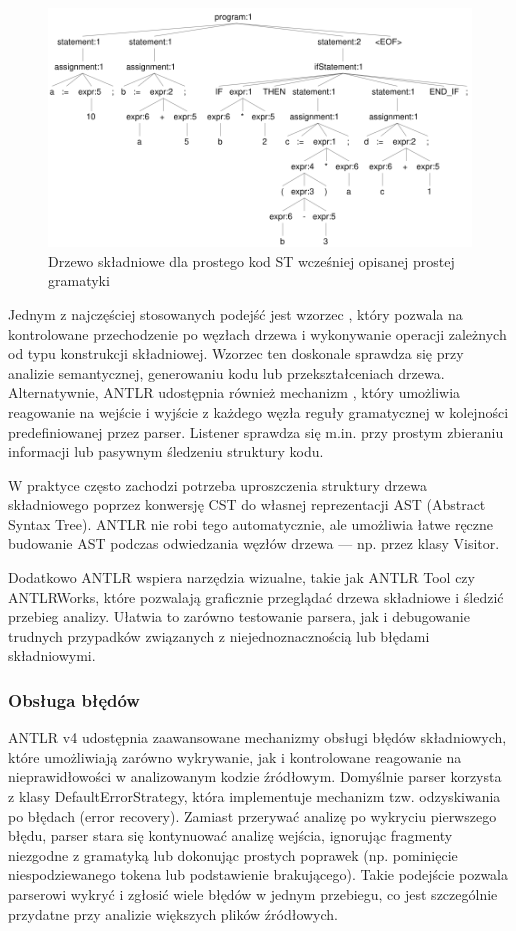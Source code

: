 \documentclass[12pt,twoside]{article}
\begin{document}
\begin{figure}[ht]
   \centering
   \includegraphics[width=15cm]{images/biggerTreeSimple.png}
   \caption{Drzewo składniowe dla prostego kod ST wcześniej opisanej prostej gramatyki}
   \label{Fig:biggerGrammarTree}
\end{figure}

Jednym z najczęściej stosowanych podejść jest wzorzec , który pozwala na kontrolowane przechodzenie po węzłach drzewa i wykonywanie operacji zależnych od typu konstrukcji składniowej. Wzorzec ten doskonale sprawdza się przy analizie semantycznej, generowaniu kodu lub przekształceniach drzewa. Alternatywnie, ANTLR udostępnia również mechanizm , który umożliwia reagowanie na wejście i wyjście z każdego węzła reguły gramatycznej w kolejności predefiniowanej przez parser. Listener sprawdza się m.in. przy prostym zbieraniu informacji lub pasywnym śledzeniu struktury kodu.

W praktyce często zachodzi potrzeba uproszczenia struktury drzewa składniowego poprzez konwersję CST do własnej reprezentacji AST (Abstract Syntax Tree). ANTLR nie robi tego automatycznie, ale umożliwia łatwe ręczne budowanie AST podczas odwiedzania węzłów drzewa — np. przez klasy Visitor.

Dodatkowo ANTLR wspiera narzędzia wizualne, takie jak ANTLR Tool czy ANTLRWorks, które pozwalają graficznie przeglądać drzewa składniowe i śledzić przebieg analizy. Ułatwia to zarówno testowanie parsera, jak i debugowanie trudnych przypadków związanych z niejednoznacznością lub błędami składniowymi.

\subsubsection{Obsługa błędów}
ANTLR v4 udostępnia zaawansowane mechanizmy obsługi błędów składniowych, które umożliwiają zarówno wykrywanie, jak i kontrolowane reagowanie na nieprawidłowości w analizowanym kodzie źródłowym. Domyślnie parser korzysta z klasy DefaultErrorStrategy, która implementuje mechanizm tzw. odzyskiwania po błędach (error recovery). Zamiast przerywać analizę po wykryciu pierwszego błędu, parser stara się kontynuować analizę wejścia, ignorując fragmenty niezgodne z gramatyką lub dokonując prostych poprawek (np. pominięcie niespodziewanego tokena lub podstawienie brakującego). Takie podejście pozwala parserowi wykryć i zgłosić wiele błędów w jednym przebiegu, co jest szczególnie przydatne przy analizie większych plików źródłowych.
\end{document}
